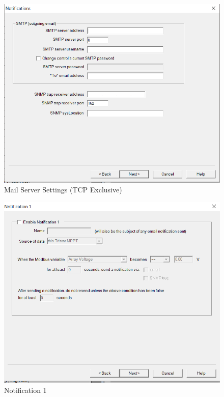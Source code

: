 \begin{figure}[!htb]
	\includegraphics[width=\textwidth,height=\textwidth]{./graphics/tsmppt_troubleshooting/ms_13.png}
	\caption{\label{fig:settings-8} Mail Server Settings (TCP Exclusive)}
\end{figure}
\begin{figure}[!htb]
	\includegraphics[width=\textwidth,height=\textwidth]{./graphics/tsmppt_troubleshooting/ms_14.png}
	\caption{\label{fig:settings-9} Notification 1}
\end{figure}
